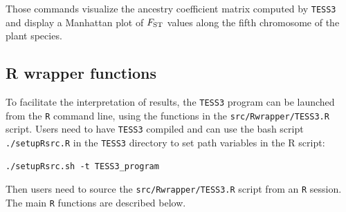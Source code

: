 \documentclass[10pt,a4paper]{article}
\begin{document}
Those commands visualize the ancestry coefficient matrix computed by {\tt TESS3} and display a Manhattan plot of $F_{\rm ST}$ values along the fifth chromosome of the plant species.




\subsection{R wrapper functions}
To facilitate the interpretation of results, the {\tt TESS3} program can be launched from the {\tt R} command line, using the functions in the  \verb|src/Rwrapper/TESS3.R| script. Users need to have {\tt TESS3} compiled and can use the bash script \verb|./setupRsrc.R| in the {\tt TESS3} directory to set path variables in the R script:
\begin{Verbatim}[frame=single]
./setupRsrc.sh -t TESS3_program
\end{Verbatim}
Then users need to source the \verb|src/Rwrapper/TESS3.R| script from an {\tt R} session. The main {\tt R} functions are described below.
\end{document}
